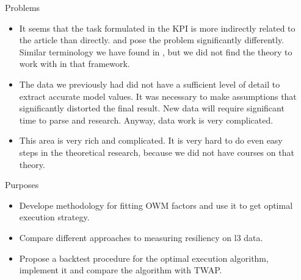 \documentclass[]{beamer}
\begin{document}
\begin{frame}[t]
\begin{columns}[t]
    
    \begin{column}{\sepwid}\end{column} %
    
    \begin{column}{\onecolwid} %
    
        
        \begin{block}{Problems}
            \begin{itemize}
                \item It seems that the task formulated in the KPI is more indirectly related to the article \cite{obizhaeva2013optimal}
                than directly. \cite{obizhaeva2013optimal} and \cite{velu2020algorithmic} pose 
                the problem significantly differently. Similar terminology we have found in \cite{webster2023handbook}, but 
                we did not find the theory to work with in that framework.
                \item The data we previously had did not have a sufficient level of detail to extract accurate model values. 
                It was necessary to make assumptions that significantly distorted the final result. 
                New data will require significant time to parse and research. Anyway, data work is very complicated.
                \item This area is very rich and complicated. It is very hard to do even easy steps in the theoretical research, 
                because we did not have courses on that theory. 
                
            \end{itemize}

            
            \end{block}


        \begin{block}{Purposes}
        \begin{itemize}
            \item Develope methodology for fitting OWM factors and use it to get optimal execution strategy.
            \item Compare different approaches to measuring resiliency on l3 data.
            \item Propose a backtest procedure for the optimal execution algorithm, implement it and compare the algorithm with TWAP.
        \end{itemize}
        

\end{block}
\end{column}
\end{columns}
\end{frame}
\end{document}
